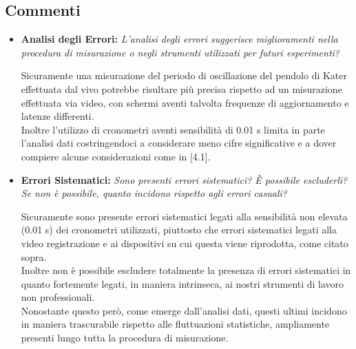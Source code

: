 \documentclass{article}
\begin{document}
\subsection{Commenti}
\begin{itemize}
    \item \textbf{Analisi degli Errori:} \textit{L'analisi degli errori suggerisce miglioramenti nella procedura di misurazione o negli strumenti utilizzati per futuri esperimenti?}
    
    Sicuramente una misurazione del periodo di oscillazione del pendolo di Kater effettuata dal vivo potrebbe risultare più precisa rispetto ad un misurazione effettuata via video, con schermi aventi talvolta frequenze di aggiornamento e latenze differenti.
    \\Inoltre l'utilizzo di cronometri aventi sensibilità di 0.01 s limita in parte l'analisi dati costringendoci a considerare meno cifre significative e a dover compiere alcune considerazioni come in [4.1]. 
    
    \item \textbf{Errori Sistematici:} \textit{Sono presenti errori sistematici? È possibile escluderli? Se non è possibile, quanto incidono rispetto agli errori casuali?}

    Sicuramente sono presente errori sistematici legati alla sensibilità non elevata (0.01 s) dei cronometri utilizzati, piuttosto che errori sistematici legati alla video registrazione e ai dispositivi su cui questa viene riprodotta, come citato sopra.
    \\Inoltre non è possibile escludere totalmente la presenza di errori sistematici in quanto fortemente legati, in maniera intrinseca, ai nostri strumenti di lavoro non professionali.
    \\Nonostante questo però, come emerge dall'analisi dati, questi ultimi incidono in maniera trascurabile rispetto alle fluttuazioni statistiche, ampliamente presenti lungo tutta la procedura di misurazione.
    
\end{itemize}
\end{document}
